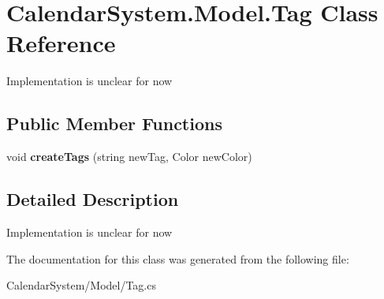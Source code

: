 \hypertarget{class_calendar_system_1_1_model_1_1_tag}{\section{Calendar\+System.\+Model.\+Tag Class Reference}
\label{class_calendar_system_1_1_model_1_1_tag}
}


Implementation is unclear for now  


\subsection*{Public Member Functions}
\begin{DoxyCompactItemize}
\item 
\hypertarget{class_calendar_system_1_1_model_1_1_tag_ada523979bd87a2161b41acad504e2a4f}{void {\bfseries create\+Tags} (string new\+Tag, Color new\+Color)}\label{class_calendar_system_1_1_model_1_1_tag_ada523979bd87a2161b41acad504e2a4f}

\end{DoxyCompactItemize}


\subsection{Detailed Description}
Implementation is unclear for now 



The documentation for this class was generated from the following file\+:\begin{DoxyCompactItemize}
\item 
Calendar\+System/\+Model/Tag.\+cs\end{DoxyCompactItemize}
